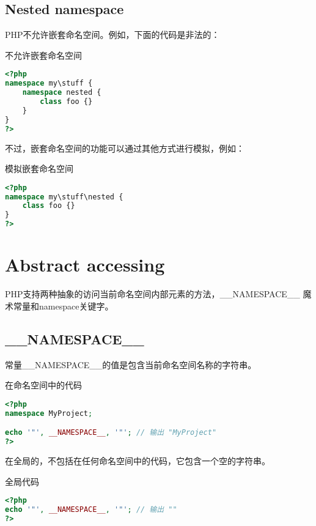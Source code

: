 \section{Nested namespace}

PHP不允许嵌套命名空间。例如，下面的代码是非法的：


\begin{example}
不允许嵌套命名空间
\begin{lstlisting}[language=PHP]
<?php
namespace my\stuff {
    namespace nested {
        class foo {}
    }
}
?>
\end{lstlisting}
\end{example}

不过，嵌套命名空间的功能可以通过其他方式进行模拟，例如：

\begin{example}
模拟嵌套命名空间
\begin{lstlisting}[language=PHP]
<?php
namespace my\stuff\nested {
    class foo {}
}
?>
\end{lstlisting}
\end{example}

\chapter{Abstract accessing}


PHP支持两种抽象的访问当前命名空间内部元素的方法，\_\_NAMESPACE\_\_ 魔术常量和namespace关键字。

\section{\_\_NAMESPACE\_\_}


常量\_\_NAMESPACE\_\_的值是包含当前命名空间名称的字符串。


\begin{example}
在命名空间中的代码
\begin{lstlisting}[language=PHP]
<?php
namespace MyProject;

echo '"', __NAMESPACE__, '"'; // 输出 "MyProject"
?>
\end{lstlisting}
\end{example}

在全局的，不包括在任何命名空间中的代码，它包含一个空的字符串。

\begin{example}
全局代码
\begin{lstlisting}[language=PHP]
<?php
echo '"', __NAMESPACE__, '"'; // 输出 ""
?>
\end{lstlisting}
\end{example}

